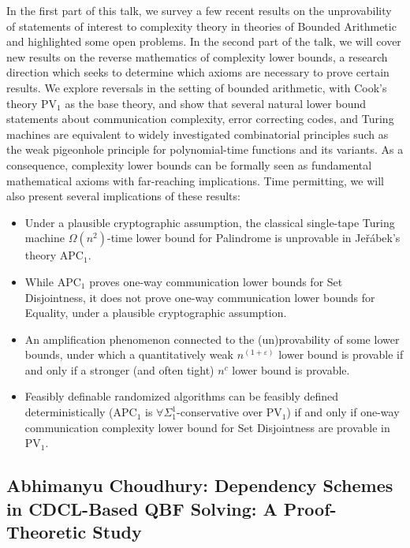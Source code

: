 \documentclass[11pt]{article}
\begin{document}
In the first part of this talk, we survey a few recent results on the unprovability of statements of interest to complexity theory in theories of Bounded Arithmetic and highlighted some open problems. In the second part of the talk, we will cover new results on the reverse mathematics of complexity lower bounds, a research direction which seeks to determine which axioms are necessary to prove certain results. We explore reversals in the setting of bounded arithmetic, with Cook's theory $\mathrm{PV}_1$ as the base theory, and show that several natural lower bound statements about communication complexity, error correcting codes, and Turing machines are equivalent to widely investigated combinatorial principles such as the weak pigeonhole principle for polynomial-time functions and its variants. As a consequence, complexity lower bounds can be formally seen as fundamental mathematical axioms with far-reaching implications. Time permitting, we will also present several implications of these results: 

\begin{itemize}
\item Under a plausible cryptographic assumption, the classical single-tape Turing machine $\Omega(n^2)$-time lower bound for Palindrome is unprovable in Je\v{r}\'{a}bek's theory $\mathrm{APC}_1$.
\item While $\mathrm{APC}_1$ proves one-way communication lower bounds for Set Disjointness, it does not prove one-way communication lower bounds for Equality, under a plausible cryptographic assumption.
\item An amplification phenomenon connected to the (un)provability of some lower bounds, under which a quantitatively weak $n^(1 + \varepsilon)$ lower bound is provable if and only if a stronger (and often tight) $n^c$ lower bound is provable.
\item Feasibly definable randomized algorithms can be feasibly defined deterministically ($\mathrm{APC}_1$ is $\forall\Sigma_1^1$-conservative over $\mathrm{PV}_1$) if and only if one-way communication complexity lower bound for Set Disjointness are provable in $\mathrm{PV}_1$.
\end{itemize}


\subsection*{Abhimanyu Choudhury: Dependency Schemes in CDCL-Based QBF Solving:
A Proof-Theoretic Study}\label{Choudhury}
\end{document}
